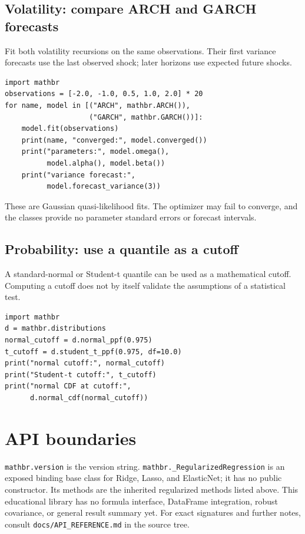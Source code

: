 \documentclass[11pt,a4paper]{article}
\begin{document}
\subsection{Volatility: compare ARCH and GARCH forecasts}
Fit both volatility recursions on the same observations. Their first variance forecasts use the last observed shock; later horizons use expected future shocks.
\begin{verbatim}
import mathbr
observations = [-2.0, -1.0, 0.5, 1.0, 2.0] * 20
for name, model in [("ARCH", mathbr.ARCH()),
                    ("GARCH", mathbr.GARCH())]:
    model.fit(observations)
    print(name, "converged:", model.converged())
    print("parameters:", model.omega(),
          model.alpha(), model.beta())
    print("variance forecast:",
          model.forecast_variance(3))
\end{verbatim}
These are Gaussian quasi-likelihood fits. The optimizer may fail to converge, and the classes provide no parameter standard errors or forecast intervals.

\subsection{Probability: use a quantile as a cutoff}
A standard-normal or Student-t quantile can be used as a mathematical cutoff. Computing a cutoff does not by itself validate the assumptions of a statistical test.
\begin{verbatim}
import mathbr
d = mathbr.distributions
normal_cutoff = d.normal_ppf(0.975)
t_cutoff = d.student_t_ppf(0.975, df=10.0)
print("normal cutoff:", normal_cutoff)
print("Student-t cutoff:", t_cutoff)
print("normal CDF at cutoff:",
      d.normal_cdf(normal_cutoff))
\end{verbatim}

\section{API boundaries}
\verb|mathbr.version| is the version string. \verb|mathbr._RegularizedRegression| is an exposed binding base class for Ridge, Lasso, and ElasticNet; it has no public constructor. Its methods are the inherited regularized methods listed above. This educational library has no formula interface, DataFrame integration, robust covariance, or general result summary yet. For exact signatures and further notes, consult \verb|docs/API_REFERENCE.md| in the source tree.
\end{document}
